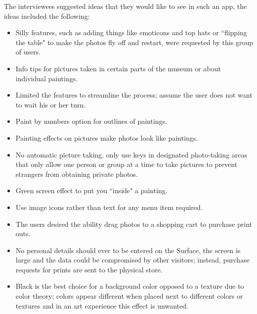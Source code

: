 \documentclass{tei2013}
\begin{document}
The interviewees suggested ideas that they would like to see in such an app, the ideas included the following:
\begin{itemize}
\item Silly features, such as adding things like emoticons and top hats or ``flipping the table" to make the photos fly off and restart, were requested by this group of users. 
\item Info tips for pictures taken in certain parts of the museum or about individual paintings.
\item Limited the features to streamline the process; assume the user does not want to wait his or her turn.
\item Paint by numbers option for outlines of paintings.
\item Painting effects on pictures make photos look like paintings.
\item No automatic picture taking, only use keys in designated photo-taking areas that only allow one person or group at a time to take pictures to prevent strangers from obtaining private photos.
\item Green screen effect to put you ``inside" a painting.
\item Use image icons rather than text for any menu item required.
\item The users desired the ability drag photos to a shopping cart to purchase print outs.
\item No personal details should ever to be entered on the Surface, the screen is large and the data could be compromised by other visitors; instead, purchase requests for prints are sent to the physical store.
\item Black is the best choice for a background color opposed to a texture due to color theory; colors appear different when placed next to different colors or textures and in an art experience this effect is unwanted.

\end{itemize}
\end{document}
